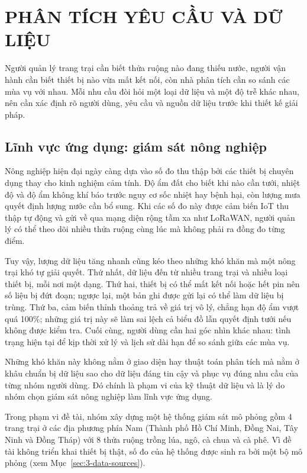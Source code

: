 \chapter{PHÂN TÍCH YÊU CẦU VÀ DỮ LIỆU}
\label{chap:3-requirements}

Người quản lý trang trại cần biết thửa ruộng nào đang thiếu nước, người vận hành cần biết thiết bị nào vừa mất kết nối, còn nhà phân tích cần so sánh các mùa vụ với nhau. Mỗi nhu cầu đòi hỏi một loại dữ liệu và một độ trễ khác nhau, nên cần xác định rõ người dùng, yêu cầu và nguồn dữ liệu trước khi thiết kế giải pháp.

\section{Lĩnh vực ứng dụng: giám sát nông nghiệp}
\label{sec:3-domain}

Nông nghiệp hiện đại ngày càng dựa vào số đo thu thập bởi các thiết bị chuyên dụng thay cho kinh nghiệm cảm tính. Độ ẩm đất cho biết khi nào cần tưới, nhiệt độ và độ ẩm không khí báo trước nguy cơ sốc nhiệt hay bệnh hại, còn lượng mưa quyết định lượng nước cần bổ sung. Khi các số đo này được cảm biến IoT thu thập tự động và gửi về qua mạng diện rộng tầm xa như LoRaWAN, người quản lý có thể theo dõi nhiều thửa ruộng cùng lúc mà không phải ra đồng đo từng điểm.

Tuy vậy, lượng dữ liệu tăng nhanh cũng kéo theo những khó khăn mà một nông trại khó tự giải quyết. Thứ nhất, dữ liệu đến từ nhiều trang trại và nhiều loại thiết bị, mỗi nơi một dạng. Thứ hai, thiết bị có thể mất kết nối hoặc hết pin nên số liệu bị đứt đoạn; ngược lại, một bản ghi được gửi lại có thể làm dữ liệu bị trùng. Thứ ba, cảm biến thỉnh thoảng trả về giá trị vô lý, chẳng hạn độ ẩm vượt quá 100\%; những giá trị này sẽ làm sai lệch cả biểu đồ lẫn quyết định tưới nếu không được kiểm tra. Cuối cùng, người dùng cần hai góc nhìn khác nhau: tình trạng hiện tại để kịp thời xử lý và lịch sử dài hạn để so sánh giữa các mùa vụ.

Những khó khăn này không nằm ở giao diện hay thuật toán phân tích mà nằm ở khâu chuẩn bị dữ liệu sao cho dữ liệu đáng tin cậy và phục vụ đúng nhu cầu của từng nhóm người dùng. Đó chính là phạm vi của kỹ thuật dữ liệu và là lý do nhóm chọn giám sát nông nghiệp làm lĩnh vực ứng dụng.

Trong phạm vi đề tài, nhóm xây dựng một hệ thống giám sát mô phỏng gồm 4 trang trại ở các địa phương phía Nam (Thành phố Hồ Chí Minh, Đồng Nai, Tây Ninh và Đồng Tháp) với 8 thửa ruộng trồng lúa, ngô, cà chua và cà phê. Vì đề tài không triển khai thiết bị thật, số đo của hệ thống được sinh ra bởi một bộ mô phỏng (xem Mục~\ref{sec:3-data-sources}).


